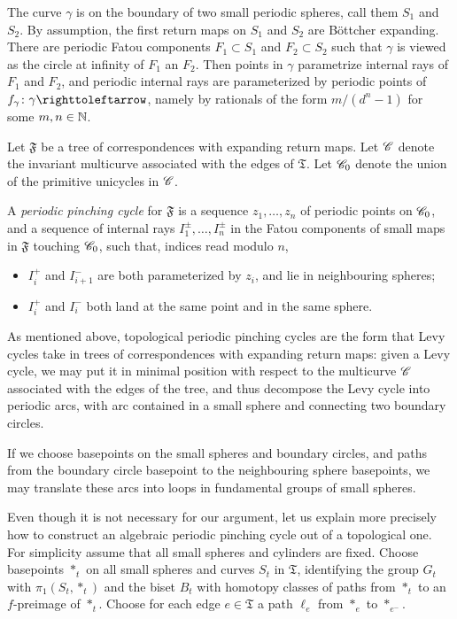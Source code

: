 \documentclass{amsart}
\begin{document}
The curve $\gamma$ is on the boundary of two small periodic spheres,
call them $S_1$ and $S_2$. By assumption, the first return maps on
$S_1$ and $S_2$ are B\"ottcher expanding. There are periodic Fatou
components $F_1\subset S_1$ and $F_2\subset S_2$ such that $\gamma$ is
viewed as the circle at infinity of $F_1$ an $F_2$. Then points in
$\gamma$ parametrize internal rays of $F_1$ and $F_2$, and periodic
internal rays are parameterized by periodic points of
$f_\gamma\colon \gamma\selfmap$, namely by rationals of the form
$m/(d^n-1)$ for some $m,n\in{\mathbb N}$.
 
\begin{defn}
\label{defn:topPinchCycle}
  Let $\mathfrak F$ be a tree of correspondences with expanding return
  maps. Let ${\mathscr C}$ denote the invariant multicurve associated with
  the edges of $\mathfrak T$.  Let ${\mathscr C}_0$ denote the union of the
  primitive unicycles in ${\mathscr C}$.

  A \emph{periodic pinching cycle} for $\mathfrak F$ is a sequence
  $z_1,\dots,z_n$ of periodic points on ${\mathscr C}_0$, and a sequence of
  internal rays $I_1^\pm,\dots,I_n^\pm$ in the Fatou components of
  small maps in $\mathfrak F$ touching ${\mathscr C}_0$, such that, indices read
  modulo $n$,
  \begin{itemize}
  \item $I_i^+$ and $I_{i+1}^-$ are both parameterized by $z_i$, and
    lie in neighbouring spheres;
  \item $I_i^+$ and $I_i^-$ both land at the same point and in the
    same sphere.\qedhere
  \end{itemize}
\end{defn}

As mentioned above, topological periodic pinching cycles are the form
that Levy cycles take in trees of correspondences with expanding
return maps: given a Levy cycle, we may put it in minimal position
with respect to the multicurve ${\mathscr C}$ associated with the edges of the
tree, and thus decompose the Levy cycle into periodic arcs, with arc
contained in a small sphere and connecting two boundary circles.

If we choose basepoints on the small spheres and boundary circles, and
paths from the boundary circle basepoint to the neighbouring sphere
basepoints, we may translate these arcs into loops in fundamental
groups of small spheres.

Even though it is not necessary for our argument, let us explain more
precisely how to construct an algebraic periodic pinching cycle out of
a topological one. For simplicity assume that all small spheres and
cylinders are fixed. Choose basepoints $*_t$ on all small spheres and
curves $S_t$ in $\mathfrak T$, identifying the group $G_t$ with
$\pi_1(S_t,*_t)$ and the biset $B_t$ with homotopy classes of paths
from $*_t$ to an $f$-preimage of $*_t$. Choose for each edge
$e\in\mathfrak T$ a path $\ell_e$ from $*_e$ to $*_{e^-}$.
\end{document}
